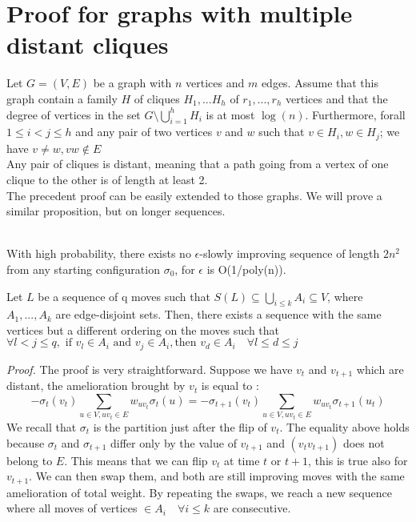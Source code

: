 \section{Proof for graphs with multiple distant cliques}
Let $G = (V,E)$ be a graph with $n$ vertices and $m$ edges. Assume that this graph contain a family $H$ of cliques $H_1, ... H_h$ of $r_1, ... , r_h$ vertices and that the degree of vertices in the set $G \setminus \bigcup_{i = 1}^h H_i$ is at most $\log(n)$. Furthermore, forall $1 \leq i < j \leq h$ and any pair of two vertices $v$ and $w$ such that  $v \in H_i, w \in H_j$; we have $v \neq w, vw \not \in E$\\
Any pair of cliques is distant, meaning that a path going from a vertex of one clique to the other is of length at least 2. \\
The precedent proof can be easily extended to those graphs. We will prove a similar proposition, but on longer sequences.

\begin{proposition}
\leavevmode \\
With high probability, there exists no $\epsilon$-slowly improving sequence of length $2n^2$ from any starting configuration $\sigma_0$, for $\epsilon$ is O(1/poly(n)).
\end{proposition}

\begin{lemma}
\label{edgeDisjoint}
Let $L$ be a sequence of q moves such that $S(L) \subseteq \bigcup_{i \leq k}A_i  \subseteq V$, where $A_1, ... , A_k$ are edge-disjoint sets. Then, there exists a sequence with the same vertices but a different ordering on the moves such that $\forall l < j \leq q, \text{ if } v_l \in A_i \text{ and } v_j \in A_i, \text{then } v_d \in A_i \quad\forall l \leq d  \leq j$   
\end{lemma}
\textit{Proof.} The proof is very straightforward. Suppose we have $v_t$ and $v_{t+1}$ which are distant, the amelioration brought by $v_t$ is equal to :
\begin{equation*}
-\sigma_t(v_t) \sum_{u \in V, uv_t \in E}w_{uv_t}\sigma_t(u) = -\sigma_{t+1}(v_t) \sum_{u \in V, uv_t \in E}w_{uv_t}\sigma_{t+1}(u_t) 
\end{equation*}
We recall that $\sigma_t$ is the partition just after the flip of $v_t$. The equality above holds because $\sigma_t$ and $\sigma_{t+1}$ differ only by the value of $v_{t+1}$ and $ (v_t v_{t+1})$ does not belong to $E$. This means that we can flip $v_t$ at time $t$ or $t+1$, this is true also for $v_{t+1}$. We can then swap them, and both are still improving moves with the same amelioration of total weight. By repeating the swaps, we reach a new sequence where all moves of vertices $\in A_i \quad \forall i \leq k$ are consecutive.\\

